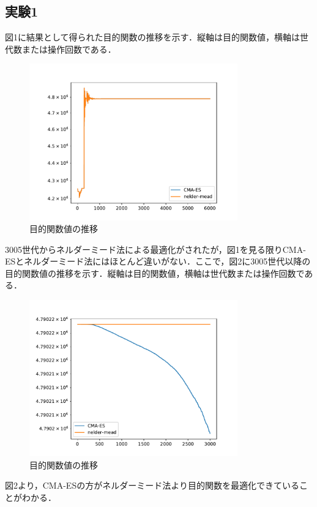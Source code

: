 \documentclass[twocolumn]{jarticle}
\begin{document}
	\subsection{実験1}
		図1に結果として得られた目的関数の推移を示す．縦軸は目的関数値，横軸は世代数または操作回数である．
		\begin{figure}	%
			\centering
            \includegraphics[width=9cm]{cmaes_nelder.pdf}
            \caption{目的関数値の推移}
        \end{figure}
		3005世代からネルダーミード法による最適化がされたが，図1を見る限りCMA-ESとネルダーミード法にはほとんど違いがない．ここで，図2に3005世代以降の目的関数値の推移を示す．縦軸は目的関数値，横軸は世代数または操作回数である．
		\begin{figure}	%
			\centering
            \includegraphics[width=9cm]{cmaes_nelder_v2.pdf}
            \caption{目的関数値の推移}
        \end{figure}
		図2より，CMA-ESの方がネルダーミード法より目的関数を最適化できていることがわかる．
\end{document}
